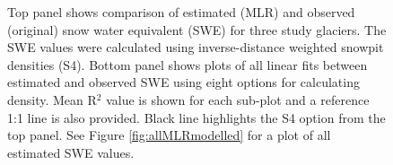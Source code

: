 \documentclass[12pt]{article}
\begin{document}
\begin{figure}[H]
    \centering
    \begin{subfigure}[b]{\textwidth}
	\label{fig:MLRfit_opt8}
    \end{subfigure}
    
    \begin{subfigure}[b]{\textwidth}
	\label{fig:MLRfit_allLines}
    \end{subfigure}

    \caption{Top panel shows comparison of estimated (MLR) and observed (original) snow water equivalent (SWE) for three study glaciers. The SWE values were calculated using inverse-distance weighted snowpit densities (S4). Bottom panel shows plots of all linear fits between estimated and observed SWE using eight options for calculating density. Mean R$^2$ value is shown for each sub-plot and a reference 1:1 line is also provided. Black line highlights the S4 option from the top panel. See Figure \ref{fig:allMLRmodelled} for a plot of all estimated SWE values.}
    \label{fig:MLRfit}
\end{figure}
\end{document}
